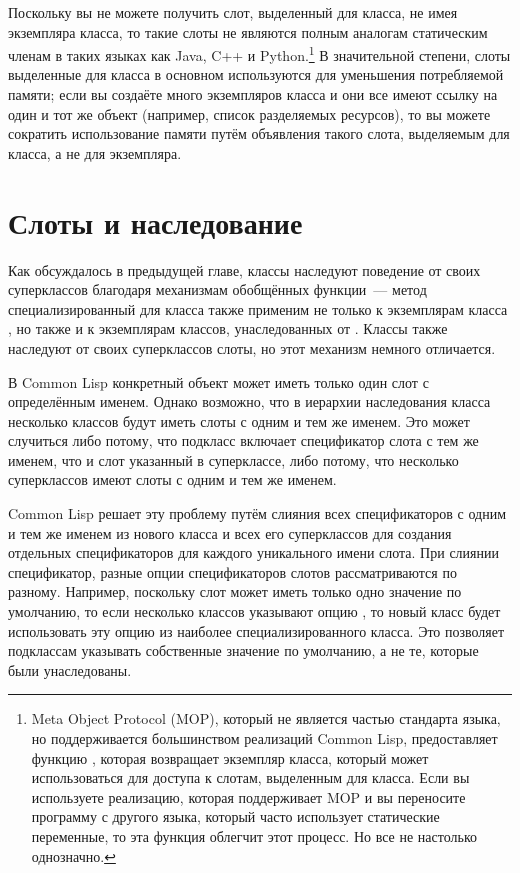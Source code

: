Поскольку вы не можете получить слот, выделенный для класса, не имея экземпляра класса, то
такие слоты не являются полным аналогам статическим членам в таких языках как Java, C++ и
Python.\footnote{Meta Object Protocol (MOP), который не является частью стандарта языка,
  но поддерживается большинством реализаций Common Lisp, предоставляет функцию
  , которая возвращает экземпляр класса, который может
  использоваться для доступа к слотам, выделенным для класса.  Если вы используете
  реализацию, которая поддерживает MOP и вы переносите программу с другого языка, который
  часто использует статические переменные, то эта функция облегчит этот процесс.  Но все
  не настолько однозначно.}  В значительной степени, слоты выделенные для класса в
основном используются для уменьшения потребляемой памяти; если вы создаёте много
экземпляров класса и они все имеют ссылку на один и тот же объект (например, список
разделяемых ресурсов), то вы можете сократить использование памяти путём объявления такого
слота, выделяемым для класса, а не для экземпляра.

\section{Слоты и наследование}

Как обсуждалось в предыдущей главе, классы наследуют поведение от своих суперклассов
благодаря механизмам обобщённых функции~--- метод специализированный для класса 
также применим не только к экземплярам класса , но также и к экземплярам классов,
унаследованных от .  Классы также наследуют от своих суперклассов слоты, но этот
механизм немного отличается.

В Common Lisp конкретный объект может иметь только один слот с определённым именем.
Однако возможно, что в иерархии наследования класса несколько классов будут иметь слоты с
одним и тем же именем.  Это может случиться либо потому, что подкласс включает
спецификатор слота с тем же именем, что и слот указанный в суперклассе, либо потому, что
несколько суперклассов имеют слоты с одним и тем же именем.

Common Lisp решает эту проблему путём слияния всех спецификаторов с одним и тем же именем
из нового класса и всех его суперклассов для создания отдельных спецификаторов для каждого
уникального имени слота.  При слиянии спецификатор, разные опции спецификаторов слотов
рассматриваются по разному.  Например, поскольку слот может иметь только одно значение по
умолчанию, то если несколько классов указывают опцию , то новый класс
будет использовать эту опцию из наиболее специализированного класса.  Это позволяет
подклассам указывать собственные значение по умолчанию, а не те, которые были
унаследованы.


